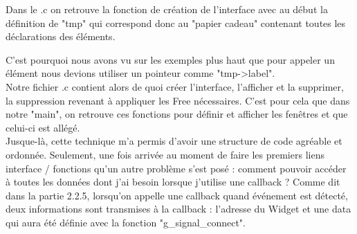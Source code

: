 \documentclass[11pt,french,a4paper]{report}
\begin{document}
Dans le .c on retrouve la fonction de création de l'interface avec au début la définition de "tmp" qui correspond donc 
au "papier cadeau" contenant toutes les déclarations des éléments. 

C'est pourquoi nous avons vu sur les exemples plus haut 
que pour appeler un élément nous devions utiliser un pointeur comme "tmp->label". \\

Notre fichier .c contient alors de quoi créer l'interface, l'afficher et la supprimer, la suppression revenant à appliquer les 
Free  nécessaires. C'est pour cela que dans notre "main", on retrouve ces fonctions pour définir et afficher les fenêtres 
et que celui-ci est allégé. \\

Jusque-là, cette technique m'a permis d'avoir une structure de code agréable et ordonnée. Seulement, une fois arrivée au moment de 
faire les premiers liens interface / fonctions qu'un autre problème s'est posé : comment pouvoir accéder à toutes les données
dont j'ai besoin lorsque j'utilise une callback ? 
Comme dit dans la partie 2.2.5, lorsqu'on appelle une callback quand événement est détecté, deux informations sont 
transmises à la callback : l'adresse du Widget et une data qui aura été définie avec la fonction "g\_signal\_connect". \\
\end{document}
